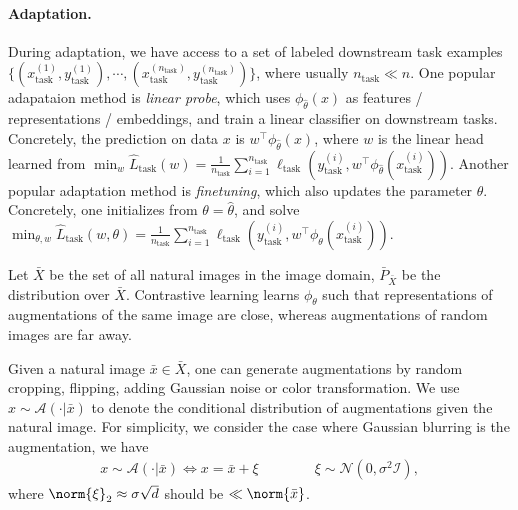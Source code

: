 \paragraph{Adaptation.} During adaptation, we have access to a set of labeled downstream task examples $\{(x^{(1)}_{\text{task}}, y^{(1)}_{\text{task}}), \cdots, (x^{(n_{\text{task}})}_{\text{task}}, y^{(n_{\text{task}})}_{\text{task}})\}$, where usually $n_{\text{task}}\ll n$. One popular adapataion method is \emph{linear probe}, which uses $\phi_{\hat{\theta}}(x)$ as features / representations / embeddings, and train a linear classifier on downstream tasks. Concretely, the prediction on data $x$ is $w^\top \phi_{\hat{\theta}}(x)$, where $w$ is the linear head learned from $\min_{w} \hat{L}_{\text{task}}(w) = \frac{1}{n_{\text{task}}} \sum_{i=1}^{n_{\text{task}}} \ell_{\text{task}}(y^{(i)}_{\text{task}}, w^\top \phi_{\hat{\theta}}(x^{(i)}_{\text{task}}))$. Another popular adaptation method is \emph{finetuning}, which also updates the parameter $\theta$. Concretely, one initializes from $\theta = \hat{\theta}$, and solve $\min_{\theta, w} \hat{L}_{\text{task}}(w, \theta) = \frac{1}{n_{\text{task}}} \sum_{i=1}^{n_{\text{task}}} \ell_{\text{task}}(y^{(i)}_{\text{task}}, w^\top \phi_{{\theta}}(x^{(i)}_{\text{task}}))$.


\label{section:analysis_contrastive_learning}
Let $\bar{X}$ be the set of all natural images in the image domain, $\bar{P}_{\bar{X}}$ be the distribution over $\bar{X}$. Contrastive learning learns $\phi_{\theta}$ such that representations of augmentations of the same image are close, whereas augmentations of random images are far away. 

\newcommand{\aug}[1]{\mathcal{A}(\cdot|#1)}

Given a natural image $\bar{x}\in\bar{X}$, one can generate augmentations by random cropping, flipping, adding Gaussian noise or color transformation. We use $x\sim\aug{\bar{x}}$ to denote the conditional distribution of augmentations given the natural image. For simplicity, we consider the case where Gaussian blurring is the augmentation, we have
\begin{align}
	x\sim\aug{\bar{x}} \Leftrightarrow x=\bar{x}+\xi \quad\quad\quad\quad \xi\sim\mathcal{N}(0, \sigma^2\mathcal{I}),
\end{align}
where $\norm{\xi}_2\approx\sigma\sqrt{d}$ should be $\ll\norm{\bar{x}}$. 

